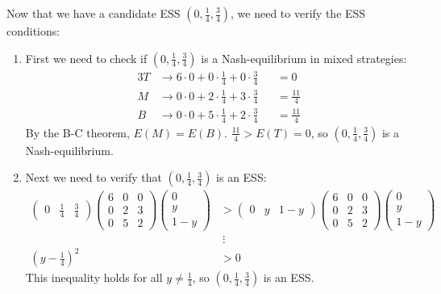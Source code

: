 \documentclass[12pt]{article}
\begin{document}
\noindent
Now that we have a candidate ESS $(0, \frac{1}{4}, \frac{3}{4})$, we need to verify the ESS conditions:

\begin{enumerate}
    \item First we need to check if $(0, \frac{1}{4}, \frac{3}{4})$ is a Nash-equilibrium in mixed strategies:
    \begin{alignat*}{3}
        T &\rightarrow 6 \cdot 0 + 0 \cdot \frac{1}{4} + 0 \cdot \frac{3}{4} &&= 0 \\
        M &\rightarrow 0 \cdot 0 + 2 \cdot \frac{1}{4} + 3 \cdot \frac{3}{4} &&= \frac{11}{4} \\
        B &\rightarrow 0 \cdot 0 + 5 \cdot \frac{1}{4} + 2 \cdot \frac{3}{4} &&= \frac{11}{4}
    \end{alignat*}
    By the B-C theorem, $E(M) = E(B)$. $\frac{11}{4} > E(T) = 0$, so $(0, \frac{1}{4}, \frac{3}{4})$ is a Nash-equilibrium.
    \item Next we need to verify that $(0, \frac{1}{4}, \frac{3}{4})$ is an ESS:
    \begin{align*} \begin{pmatrix}
        0 & \frac{1}{4} & \frac{3}{4}
    \end{pmatrix} \begin{pmatrix}
        6 & 0 & 0 \\
        0 & 2 & 3 \\
        0 & 5 & 2
    \end{pmatrix} \begin{pmatrix}
        0 \\ y \\ 1- y
    \end{pmatrix} &> \begin{pmatrix}
        0 & y & 1 - y
    \end{pmatrix} \begin{pmatrix}
        6 & 0 & 0 \\
        0 & 2 & 3 \\
        0 & 5 & 2
    \end{pmatrix} \begin{pmatrix}
        0 \\ y \\ 1- y
    \end{pmatrix} \\
    &\ \vdots \\
    \left( y - \frac{1}{4} \right)^2 &> 0
    \end{align*}
    This inequality holds for all $y \neq \frac{1}{4}$, so $(0, \frac{1}{4}, \frac{3}{4})$ is an ESS.
\end{enumerate}
\end{document}
